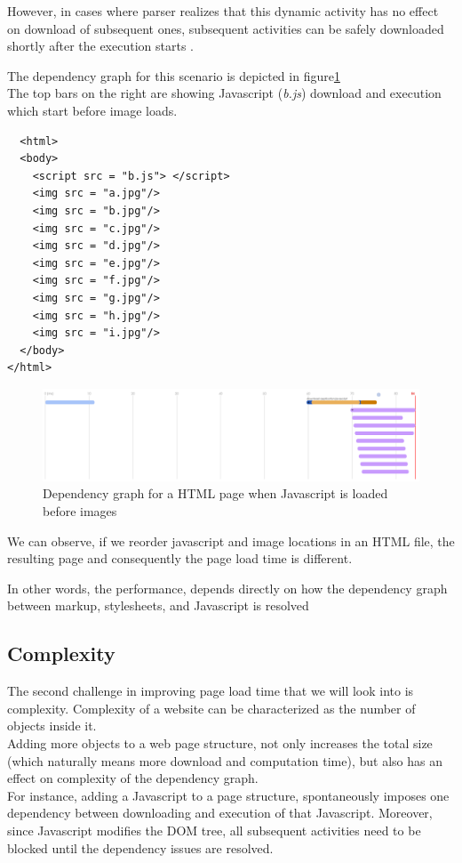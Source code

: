 \begin{enumerate}
However, in cases where parser realizes that this dynamic activity has no effect on download of subsequent ones, subsequent activities can be safely downloaded shortly after the execution starts .
 
The dependency graph for this scenario is depicted in figure\ref{fig:jsimage}\\
The top bars on the right are showing Javascript ({\em b.js}) download and execution which start before image loads.

  \begin{verbatim}
  <html>
  <body>
    <script src = "b.js"> </script>
    <img src = "a.jpg"/>
    <img src = "b.jpg"/>
    <img src = "c.jpg"/>
    <img src = "d.jpg"/>
    <img src = "e.jpg"/>
    <img src = "f.jpg"/>
    <img src = "g.jpg"/>
    <img src = "h.jpg"/>
    <img src = "i.jpg"/>
  </body>
</html>
\end{verbatim}

 \begin{figure}[!htb]
  \centering
    \includegraphics[width=0.85 \textwidth]{./figures/introduction/jsimage.pdf}
  \caption {Dependency graph for a HTML page when Javascript is loaded before images}
  \label{fig:jsimage}
\end{figure}

\end{enumerate}
 We can observe, if we reorder javascript and image locations in an HTML file, the resulting page and consequently the page load time is different.\\
 
\noindent \colorbox{gray!20}{\parbox{0.9\textwidth}{In other words, the performance, depends directly on how the dependency graph between markup, stylesheets, and Javascript is resolved}}

\subsection{Complexity}
The second challenge in improving page load time that we will look into is complexity.
Complexity of a website can be characterized as the number of objects inside it. \\
Adding more objects to a web page structure, not only increases the total size (which naturally means more download and computation time), but also has an effect on complexity of the dependency graph. \\
For instance, adding a Javascript to a page structure, spontaneously imposes one dependency between downloading and execution of that Javascript. Moreover, since Javascript modifies the DOM tree, all subsequent activities need to be blocked until the dependency issues are resolved. 

